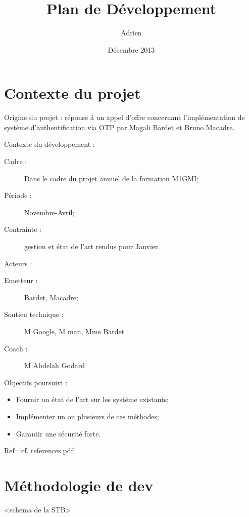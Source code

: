 \documentclass{../../res/univ-projet}
\title{Plan de D\'eveloppement}
\author{Adrien \bsc{Smondack}}
\date{D\'ecembre 2013}
\begin{document}
\maketitle

\section{Contexte du projet}
	Origine du projet : r\'eponse \'a un appel d'offre concernant l'impl\'ementation de syst\`eme d'authentification via OTP par Magali Bardet et Bruno Macadre.
	
	Contexte du d\'eveloppement :
	\begin{description} 
		\item [Cadre :] Dans le cadre du projet annuel de la formation M1GMI;
		\item [P\'eriode :] Novembre-Avril;
		\item [Contrainte :] gestion et \'etat de l'art rendus pour Janvier.
	\end{description}
	Acteurs :
	\begin{description}
		\item [Emetteur :] Bardet, Macadre;
		\item [Soutien technique :] M Google, M man, Mme Bardet
		\item [Coach :] M Abdelah Godard
	\end{description}
	Objectifs poursuivi :
	\begin{itemize}
		\item Fournir un \'etat de l'art sur les syst\'eme existants;
		\item Impl\'ementer un ou plusieurs de ces m\'ethodes;
		\item Garantir une s\'ecurit\'e forte.
	\end{itemize}
	Ref : cf. references.pdf

\section{M\'ethodologie de dev}
	<schema de la STB>
\end{document}
